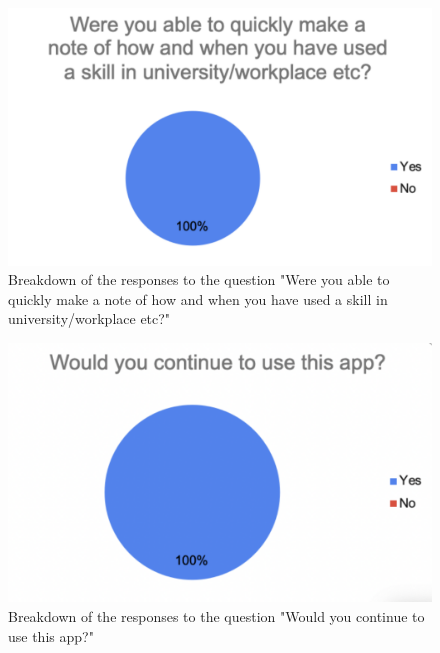 \documentclass{l4proj}
\begin{document}
\begin{appendices}
\begin{figure}[H]
    \begin{centering}
    \includegraphics[scale=0.5]{images/userSurvey1.pdf}
    \caption{Breakdown of the responses to the question "Were you able to quickly make a note of how and when you have used a skill in university/workplace etc?"}
    \label{fig: userSurvey1}
    \end{centering}
\end{figure}

\begin{figure}[H]
    \begin{centering}
    \includegraphics[scale=0.5]{images/userSurvey2.pdf}
    \caption{Breakdown of the responses to the question "Would you continue to use this app?"}
    \label{fig: userSurvey2}
    \end{centering}
\end{figure}


\end{appendices}
\end{document}
